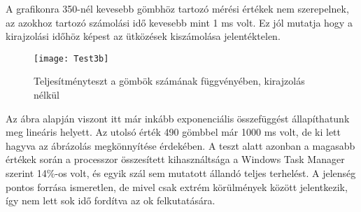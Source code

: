 A grafikonra 350-nél kevesebb gömbhöz tartozó mérési értékek nem szerepelnek, az azokhoz tartozó számolási idő kevesebb mint 1 ms volt. Ez jól mutatja hogy a kirajzolási időhöz képest az ütközések kiszámolása jelentéktelen.

\begin{figure}[H]
	\centering
	\texttt{[image: Test3b]}
	\caption{Teljesítményteszt a gömbök számának függvényében, kirajzolás nélkül}
	\label{fig:Test3}
\end{figure}

Az ábra alapján viszont itt már inkább exponenciális összefüggést állapíthatunk meg lineáris helyett. Az utolsó érték 490 gömbbel már 1000 ms volt, de ki lett hagyva az ábrázolás megkönnyítése érdekében. A teszt alatt azonban a magasabb értékek során a processzor összesített kihasználtsága a Windows Task Manager szerint 14\%-os volt, és egyik szál sem mutatott állandó teljes terhelést.  A jelenség pontos forrása ismeretlen, de mivel csak extrém körülmények között jelentkezik, így nem lett sok idő fordítva az ok felkutatására.